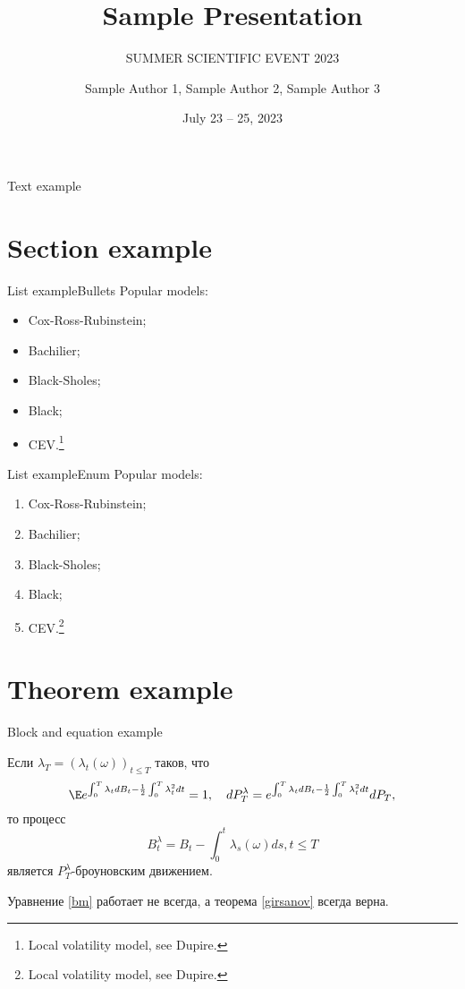 \documentclass[aspectratio=169]{beamer} %
\title{Sample Presentation}
\subtitle{SUMMER SCIENTIFIC EVENT 2023} %
\author{Sample Author 1, Sample Author 2, Sample Author 3}
\institute{Vega Institute Foundation}
\date{July 23 -- 25, 2023}
\begin{document}
    \maketitle          %

    \begin{frame}{Text example}
        \lipsum[1]
    \end{frame}

    \section{Section example}
    \begin{frame}{List example}{Bullets}
        Popular models:
        \begin{itemize}
            \item Cox-Ross-Rubinstein;
            \item Bachilier;
            \item Black-Sholes;
            \item Black;
            \item CEV.\footnote{Local volatility model, see Dupire.}
        \end{itemize}
    \end{frame}

    \begin{frame}{List example}{Enum} 
        Popular models:
        \begin{enumerate}
            \item Cox-Ross-Rubinstein;
            \item Bachilier;
            \item Black-Sholes;
            \item Black;
            \item CEV.\footnote{Local volatility model, see Dupire.}
        \end{enumerate}
    \end{frame}

    \section{Theorem example}
    \begin{frame}{Block  and equation example}
        \begin{theorem}[И. Гирсанов]\label{girsanov}
			Если $\lambda_T = (\lambda_t (\omega))_{t \leq T}$ таков, что 
			\begin{equation}
             \E e^{\int_0^T \lambda_t dB_t - \frac{1}{2}\int_0^T \lambda_t^2 dt} = 1, \quad dP_T^\lambda = e^{\int_0^T \lambda_t dB_t - \frac{1}{2}\int_0^T \lambda_t^2 dt} dP_T,
			\end{equation}
			то процесс 
			\begin{equation}\label{bm}
				B^\lambda_t = B_t - \int_0^t \lambda_s(\omega) ds, t \leq T
			\end{equation}
			 является $P_T^\lambda$-броуновским движением.
		\end{theorem}
        Уравнение \eqref{bm} работает не всегда, а теорема \ref{girsanov} всегда верна.
    \end{frame}
\end{document}
